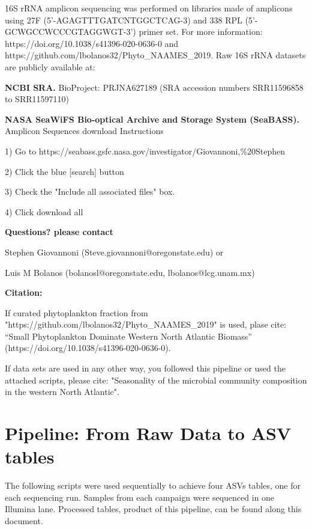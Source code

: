 \documentclass{article}
\begin{document}
16S rRNA amplicon sequencing was performed on libraries made of amplicons using 27F (5'-AGAGTTTGATCNTGGCTCAG-3) and 338 RPL (5'- GCWGCCWCCCGTAGGWGT-3') primer set. For more information: https://doi.org/10.1038/s41396-020-0636-0 and https://github.com/lbolanos32/Phyto\_NAAMES\_2019. Raw 16S rRNA datasets are publicly available at:

\begin{description}\sloppy

\item[$-$] \textbf{NCBI SRA.} BioProject: PRJNA627189 (SRA accession numbers SRR11596858 to SRR11597110)

\item[$-$] \textbf {NASA SeaWiFS Bio-optical Archive and Storage System (SeaBASS).} 
Amplicon Sequences download Instructions

1) Go to https://seabass.gsfc.nasa.gov/investigator/Giovannoni,\%20Stephen

2) Click the blue [search] button

3) Check the "Include all associated files" box.

4) Click download all

\end{description}

\textbf{Questions? please contact}
\begin{description}\sloppy
\item[$\bullet$] Stephen Giovannoni (Steve.giovannoni@oregonstate.edu) or
\item[$\bullet$] Luis M Bolanos (bolanosl@oregonstate.edu, lbolanos@lcg.unam.mx) 
\end{description}

\textbf {Citation:}
\begin{description}\sloppy
\item[$\bullet$]If curated phytoplankton fraction from "https://github.com/lbolanos32/Phyto\_NAAMES\_2019" is used, plase cite: “Small Phytoplankton Dominate Western North Atlantic Biomass” (https://doi.org/10.1038/s41396-020-0636-0).
\item[$\bullet$]If data sets are used in any other way, you followed this pipeline or used the attached scripts, please cite: "Seasonality of the microbial community composition in the western North Atlantic".
\end{description}

\section{Pipeline: From Raw Data to ASV tables}
The following scripts were used sequentially to achieve four ASVs tables, one for each sequencing run. Samples from each campaign were sequenced in one Illumina lane.  Processed tables, product of this pipeline, can be found along this document.
\end{document}
